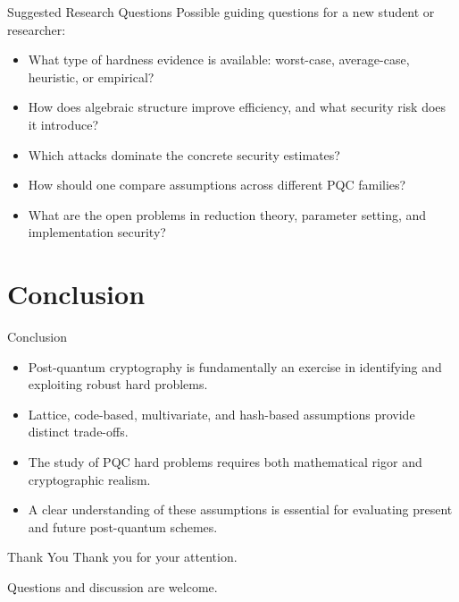 \documentclass[aspectratio=169]{beamer}
\begin{document}
	\begin{frame}{Suggested Research Questions}
		Possible guiding questions for a new student or researcher:
		\begin{itemize}
			\item What type of hardness evidence is available: worst-case, average-case, heuristic, or empirical?
			\item How does algebraic structure improve efficiency, and what security risk does it introduce?
			\item Which attacks dominate the concrete security estimates?
			\item How should one compare assumptions across different PQC families?
			\item What are the open problems in reduction theory, parameter setting, and implementation security?
		\end{itemize}
	\end{frame}
	
	\section{Conclusion}
	
	\begin{frame}{Conclusion}
		\begin{itemize}
			\item Post-quantum cryptography is fundamentally an exercise in identifying and exploiting robust hard problems.
			\item Lattice, code-based, multivariate, and hash-based assumptions provide distinct trade-offs.
			\item The study of PQC hard problems requires both mathematical rigor and cryptographic realism.
			\item A clear understanding of these assumptions is essential for evaluating present and future post-quantum schemes.
		\end{itemize}
	\end{frame}
	
	\begin{frame}{Thank You}
		\centering
		{\Large Thank you for your attention.}
		
		\vspace{1em}
		Questions and discussion are welcome.
	\end{frame}
	
\end{document}
